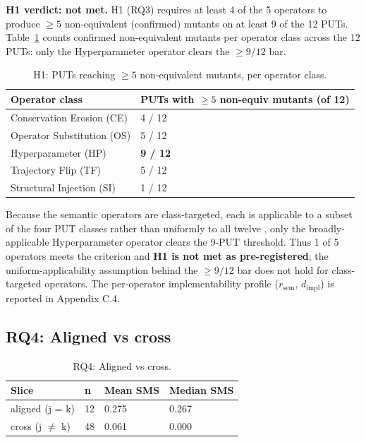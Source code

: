 \documentclass[acmsmall,screen,review]{acmart}
\begin{document}
\textbf{H1 verdict: not met.} H1 (RQ3) requires at least 4 of the 5
operators to produce $\geq 5$ non-equivalent (confirmed) mutants on at
least 9 of the 12 PUTs. Table~\ref{tab:p2-32} counts confirmed
non-equivalent mutants per operator class across the 12 PUTs: only the
Hyperparameter operator clears the $\geq 9/12$ bar.

{\def\LTcaptype{table} %
\begin{longtable}[]{@{}ll@{}}
\caption{H1: PUTs reaching $\geq 5$ non-equivalent mutants, per operator
class.}\label{tab:p2-32}\\
\toprule\noalign{}
Operator class & PUTs with $\geq 5$ non-equiv mutants (of 12) \\
\midrule\noalign{}
\endfirsthead
\endhead
\bottomrule\noalign{}
\endlastfoot
Conservation Erosion (CE) & 4 / 12 \\
Operator Substitution (OS) & 5 / 12 \\
Hyperparameter (HP) & \textbf{9 / 12} \\
Trajectory Flip (TF) & 5 / 12 \\
Structural Injection (SI) & 1 / 12 \\
\end{longtable}
}

Because the semantic operators are class-targeted, each is applicable
to a subset of the four PUT classes rather than uniformly to all twelve
, only the broadly-applicable Hyperparameter operator clears the
9-PUT threshold. Thus 1 of 5 operators meets the criterion and
\textbf{H1 is not met as pre-registered}; the uniform-applicability
assumption behind the $\geq 9/12$ bar does not hold for class-targeted
operators. The per-operator implementability profile ($r_{\mathrm{sem}}$,
$d_{\mathrm{impl}}$) is reported in Appendix C.4.

\subsection{RQ4: Aligned vs cross}\label{rq2-aligned-vs-cross-cliffs-delta}

{\def\LTcaptype{table} %
\begin{longtable}[]{@{}llll@{}}
\caption{RQ4: Aligned vs cross.}\label{tab:p2-09}\\
\toprule\noalign{}
Slice & n & Mean SMS & Median SMS \\
\midrule\noalign{}
\endhead
\bottomrule\noalign{}
\endlastfoot
aligned (j = k) & 12 & 0.275 & 0.267 \\
cross (j $\neq$ k) & 48 & 0.061 & 0.000 \\
\end{longtable}
}
\end{document}
